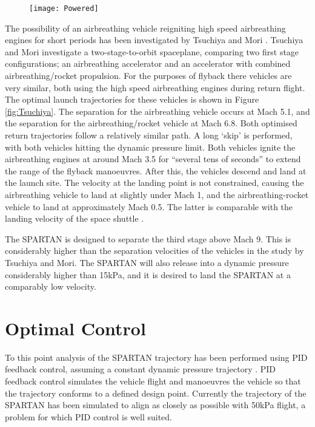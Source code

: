 \begin{figure}
\centering
\texttt{[image: Powered]}
\caption{}
\label{fig:Powered}
\end{figure}



The possibility of an airbreathing vehicle reigniting high speed airbreathing engines for short periods has been investigated by Tsuchiya and Mori \cite{Tsuchiya2005}. Tsuchiya and Mori investigate a two-stage-to-orbit spaceplane, comparing two first stage configurations; an airbreathing accelerator and an accelerator with combined airbreathing/rocket propulsion. For the purposes of flyback there vehicles are very similar, both using the high speed airbreathing engines during return flight. The optimal launch trajectories for these vehicles is shown in Figure \ref{fig:Tsuchiya}. The separation for the airbreathing vehicle occurs at Mach 5.1, and the separation for the airbreathing/rocket vehicle at Mach 6.8. Both optimised return trajectories follow a relatively similar path. A long ‘skip’ is performed, with both vehicles hitting the dynamic pressure limit. Both vehicles ignite the airbreathing engines at around Mach 3.5 for “several tens of seconds” to extend the range of the flyback manoeuvres. After this, the vehicles descend and land at the launch site. The velocity at the landing point is not constrained, causing the airbreathing vehicle to land at slightly under Mach 1, and the airbreathing-rocket vehicle to land at approximately Mach 0.5. 
The latter is comparable with the landing velocity of the space shuttle \cite{Romere1983}. 



The SPARTAN is designed to separate the third stage above Mach 9. This is considerably higher than the separation velocities of the vehicles in the study by Tsuchiya and Mori. The SPARTAN will also release into a dynamic pressure considerably higher than 15kPa, and it is desired to land the SPARTAN at a comparably low velocity.

\section{Optimal Control}


To this point analysis of the SPARTAN trajectory has been performed using PID feedback control, assuming a constant dynamic pressure trajectory \cite{Preller2015}. PID feedback control simulates the vehicle flight and manoeuvres the vehicle so that the trajectory conforms to a defined design point. Currently the trajectory of the SPARTAN has been simulated to align as closely as possible with 50kPa flight, a problem for which PID control is well suited. 

